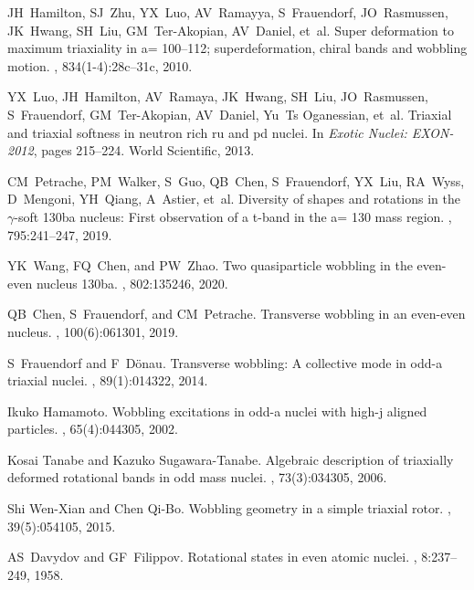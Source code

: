 \documentclass[11pt]{article}
\begin{document}
\begin{thebibliography}{99}
JH~Hamilton, SJ~Zhu, YX~Luo, AV~Ramayya, S~Frauendorf, JO~Rasmussen, JK~Hwang,
  SH~Liu, GM~Ter-Akopian, AV~Daniel, et~al.
\newblock Super deformation to maximum triaxiality in a= 100--112;
  superdeformation, chiral bands and wobbling motion.
, 834(1-4):28c--31c, 2010.

YX~Luo, JH~Hamilton, AV~Ramaya, JK~Hwang, SH~Liu, JO~Rasmussen, S~Frauendorf,
  GM~Ter-Akopian, AV~Daniel, Yu~Ts Oganessian, et~al.
\newblock Triaxial and triaxial softness in neutron rich ru and pd nuclei.
\newblock In {\em Exotic Nuclei: EXON-2012}, pages 215--224. World Scientific,
  2013.

CM~Petrache, PM~Walker, S~Guo, QB~Chen, S~Frauendorf, YX~Liu, RA~Wyss,
  D~Mengoni, YH~Qiang, A~Astier, et~al.
\newblock Diversity of shapes and rotations in the $\gamma$-soft 130ba nucleus:
  First observation of a t-band in the a= 130 mass region.
, 795:241--247, 2019.

YK~Wang, FQ~Chen, and PW~Zhao.
\newblock Two quasiparticle wobbling in the even-even nucleus 130ba.
, 802:135246, 2020.

QB~Chen, S~Frauendorf, and CM~Petrache.
\newblock Transverse wobbling in an even-even nucleus.
, 100(6):061301, 2019.

S~Frauendorf and F~D{\"o}nau.
\newblock Transverse wobbling: A collective mode in odd-a triaxial nuclei.
, 89(1):014322, 2014.

Ikuko Hamamoto.
\newblock Wobbling excitations in odd-a nuclei with high-j aligned particles.
, 65(4):044305, 2002.

Kosai Tanabe and Kazuko Sugawara-Tanabe.
\newblock Algebraic description of triaxially deformed rotational bands in odd
  mass nuclei.
, 73(3):034305, 2006.

Shi Wen-Xian and Chen Qi-Bo.
\newblock Wobbling geometry in a simple triaxial rotor.
, 39(5):054105, 2015.

AS~Davydov and GF~Filippov.
\newblock Rotational states in even atomic nuclei.
, 8:237--249, 1958.


\end{thebibliography}
\end{document}
